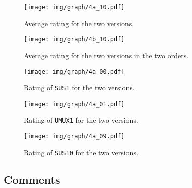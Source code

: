 \begin{figure}
\center
\texttt{[image: img/graph/4a\_10.pdf]}
\caption{Average rating for the two versions.}
\end{figure}

\begin{figure}
\center
\texttt{[image: img/graph/4b\_10.pdf]}
\caption{Average rating for the two versions in the two orders.}
\end{figure}

\begin{figure}
\center
\texttt{[image: img/graph/4a\_00.pdf]}
\caption{Rating of \texttt{SUS1} for the two versions.}
\end{figure}

\begin{figure}
\center
\texttt{[image: img/graph/4a\_01.pdf]}
\caption{Rating of \texttt{UMUX1} for the two versions.}
\end{figure}

\begin{figure}
\center
\texttt{[image: img/graph/4a\_09.pdf]}
\caption{Rating of \texttt{SUS10} for the two versions.}
\end{figure}

\subsection{Comments}
\nlipsum
